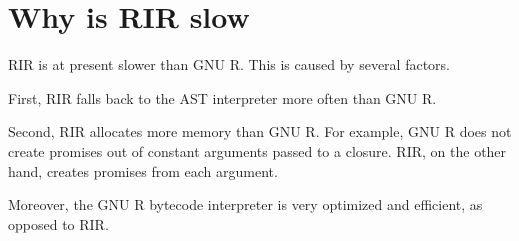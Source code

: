 
\section{Why is RIR slow}

RIR is at present slower than GNU R. This is caused by several factors.

First, RIR falls back to the AST interpreter more often than GNU R.

Second, RIR allocates more memory than GNU R. For example, GNU R does not create promises out of constant arguments passed to a closure. RIR, on the other hand, creates promises from each argument.

Moreover, the GNU R bytecode interpreter is very optimized and efficient, as opposed to RIR.
